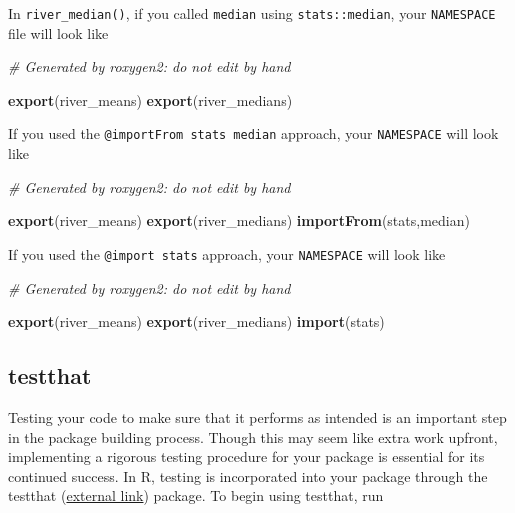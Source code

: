 \documentclass[
]{book}
\newenvironment{Shaded}{\begin{snugshade}}{\end{snugshade}}
\newcommand{\CommentTok}[1]{\textcolor[rgb]{0.56,0.35,0.01}{\textit{#1}}}
\newcommand{\KeywordTok}[1]{\textcolor[rgb]{0.13,0.29,0.53}{\textbf{#1}}}
\newcommand{\NormalTok}[1]{#1}
\begin{document}
In \texttt{river\_median()}, if you called \texttt{median} using \texttt{stats::median}, your \texttt{NAMESPACE} file will look like

\begin{Shaded}
\begin{Highlighting}[]
\CommentTok{# Generated by roxygen2: do not edit by hand}

\KeywordTok{export}\NormalTok{(river_means)}
\KeywordTok{export}\NormalTok{(river_medians)}
\end{Highlighting}
\end{Shaded}

If you used the \texttt{@importFrom\ stats\ median} approach, your \texttt{NAMESPACE} will look like

\begin{Shaded}
\begin{Highlighting}[]
\CommentTok{# Generated by roxygen2: do not edit by hand}

\KeywordTok{export}\NormalTok{(river_means)}
\KeywordTok{export}\NormalTok{(river_medians)}
\KeywordTok{importFrom}\NormalTok{(stats,median)}
\end{Highlighting}
\end{Shaded}

If you used the \texttt{@import\ stats} approach, your \texttt{NAMESPACE} will look like

\begin{Shaded}
\begin{Highlighting}[]
\CommentTok{# Generated by roxygen2: do not edit by hand}

\KeywordTok{export}\NormalTok{(river_means)}
\KeywordTok{export}\NormalTok{(river_medians)}
\KeywordTok{import}\NormalTok{(stats)}
\end{Highlighting}
\end{Shaded}

\hypertarget{testthat}{%
\subsection{testthat}\label{testthat}}

Testing your code to make sure that it performs as intended is an important step in the package building process. Though this may seem like extra work upfront, implementing a rigorous testing procedure for your package is essential for its continued success. In R, testing is incorporated into your package through the testthat (\href{https://testthat.r-lib.org/}{external link}) package. To begin using testthat, run
\end{document}
